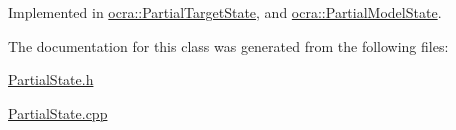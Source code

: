 Implemented in \hyperlink{classocra_1_1PartialTargetState_ad308f9041e4c2438c1a5ac66776bfaaa}{ocra\+::\+Partial\+Target\+State}, and \hyperlink{classocra_1_1PartialModelState_aed089922827f25621d582e9163fd0315}{ocra\+::\+Partial\+Model\+State}.



The documentation for this class was generated from the following files\+:\begin{DoxyCompactItemize}
\item 
\hyperlink{PartialState_8h}{Partial\+State.\+h}\item 
\hyperlink{PartialState_8cpp}{Partial\+State.\+cpp}\end{DoxyCompactItemize}
